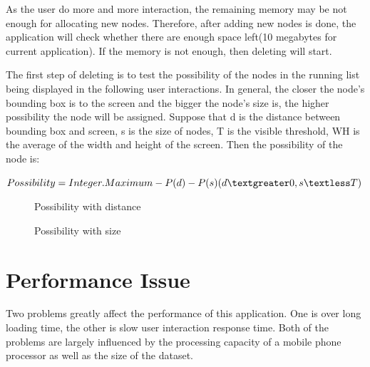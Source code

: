 \documentclass[MSc]{icldt}
\begin{document}
As the user do more and more interaction, the remaining memory may be not enough for allocating new nodes. Therefore, after adding new nodes is done, the application will check whether there are enough space left(10 megabytes for current application). If the memory is not enough, then deleting will start.

The first step of deleting is to test the possibility of the nodes in the running list being displayed in the following user interactions. In general, the closer the node's bounding box is to the screen and the bigger the node's size is, the higher possibility the node will be assigned. Suppose that d is the distance between bounding box and screen, s is the size of nodes, T is the visible threshold, WH is the average of the width and height of the screen. Then the possibility of the node is:

\begin{center}
$Possibility = Integer.Maximum - P(d) - P(s) (d \textgreater 0, s\textless T)$
\end{center}

\begin{figure}[H]
        \caption{Possibility with distance}\label{fig:animals}
\end{figure}

\begin{figure}[H]
        \caption{Possibility with size}\label{fig:animals}
\end{figure}



\chapter{Performance Issue}

Two problems greatly affect the performance of this application. One is over long loading time, the other is slow user interaction response time. Both of the problems are largely influenced by the processing capacity of a mobile phone processor as well as the size of the dataset. 
\end{document}

